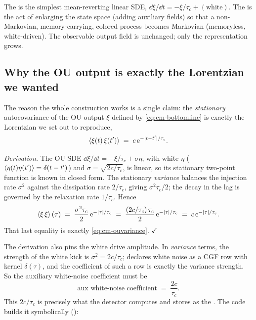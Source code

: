 \begin{defn}
The  is the simplest mean-reverting linear
SDE, $\dd\xi/\dd t = -\xi/\tau_c + (\text{white})$. The  is the act of enlarging the state space (adding auxiliary fields) so
that a non-Markovian, memory-carrying, colored process becomes Markovian
(memoryless, white-driven). The observable output field is unchanged; only the
representation grows.
\end{defn}

\subsection{Why the OU output is exactly the Lorentzian we wanted}

The reason the whole construction works is a single claim: the \emph{stationary}
autocovariance of the OU output $\xi$ defined by \eqref{eq:cm-bottomline} is
exactly the Lorentzian we set out to reproduce,
\begin{equation}
  \left\langle \xi(t)\,\xi(t') \right\rangle \;=\; c\,\mathrm{e}^{-|t-t'|/\tau_c}.
  \label{eq:cm-ouvariance}
\end{equation}

\emph{Derivation.} The OU SDE $\dd\xi/\dd t = -\xi/\tau_c + \sigma\eta$, with
white $\eta$ ($\left\langle \eta(t)\eta(t') \right\rangle = \delta(t-t')$) and
$\sigma = \sqrt{2c/\tau_c}$, is linear, so its stationary two-point function is
known in closed form. The stationary \emph{variance} balances the injection rate
$\sigma^2$ against the dissipation rate $2/\tau_c$, giving $\sigma^2 \tau_c/2$;
the decay in the lag is governed by the relaxation rate $1/\tau_c$. Hence
\begin{equation}
  \left\langle \xi\,\xi \right\rangle(\tau)
    \;=\; \frac{\sigma^2 \tau_c}{2}\,\mathrm{e}^{-|\tau|/\tau_c}
    \;=\; \frac{(2c/\tau_c)\,\tau_c}{2}\,\mathrm{e}^{-|\tau|/\tau_c}
    \;=\; c\,\mathrm{e}^{-|\tau|/\tau_c}.
  \label{eq:cm-ouvariance-derived}
\end{equation}
That last equality is exactly \eqref{eq:cm-ouvariance}. \hfill$\checkmark$

The derivation also pins the white drive amplitude. In \emph{variance} terms, the
strength of the white kick is $\sigma^2 = 2c/\tau_c$; \Daedalus{} declares white
noise as a CGF row with kernel $\delta(\tau)$, and the coefficient of such a row
is exactly the variance strength. So the auxiliary white-noise coefficient must be
\begin{equation}
  \text{aux white-noise coefficient} \;=\; \frac{2c}{\tau_c}.
  \label{eq:cm-auxdrive}
\end{equation}
This $2c/\tau_c$ is precisely what the detector computes and stores as the
. The code builds it symbolically
():

